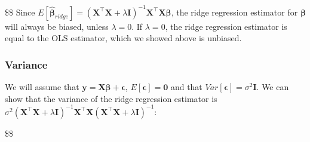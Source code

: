 \documentclass[
]{article}
\begin{document}
\$\$ Since
\(E[\hat{\boldsymbol\beta}_{ridge}] = (\mathbf{X}^\top \mathbf{X} + \lambda\mathbf{I}) ^{-1}\mathbf{X}^\top \mathbf{X}\boldsymbol\beta\),
the ridge regression estimator for \(\boldsymbol{\beta}\) will always be
biased, unless \(\lambda = 0\). If \(\lambda = 0\), the ridge regression
estimator is equal to the OLS estimator, which we showed above is
unbiased.

\hypertarget{variance}{%
\subsubsection{Variance}\label{variance}}

We will assume that
\(\mathbf{y} = \mathbf{X}\boldsymbol\beta + \boldsymbol\epsilon\),
\(E[\boldsymbol\epsilon] = \mathbf{0}\) and that
\(Var[\boldsymbol\epsilon] = \sigma^2 \mathbf{I}\). We can show that the
variance of the ridge regression estimator is
\(\sigma^2(\mathbf{X}^\top \mathbf{X} + \lambda\mathbf{I}) ^{-1}\mathbf{X}^\top \mathbf{X} (\mathbf{X}^\top \mathbf{X} + \lambda\mathbf{I})^{-1}\):

\$\$
\end{document}
